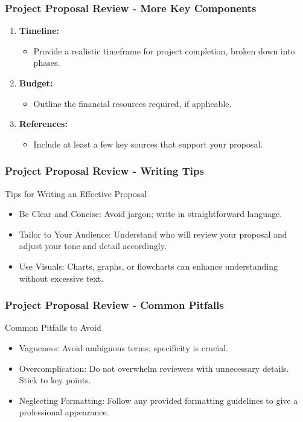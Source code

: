\documentclass[aspectratio=169]{beamer}
\begin{document}
\begin{frame}[fragile]
    \frametitle{Project Proposal Review - More Key Components}
    \begin{enumerate}[resume]
        \item \textbf{Timeline:}
            \begin{itemize}
                \item Provide a realistic timeframe for project completion, broken down into phases.
            \end{itemize}
        \item \textbf{Budget:}
            \begin{itemize}
                \item Outline the financial resources required, if applicable.
            \end{itemize}
        \item \textbf{References:}
            \begin{itemize}
                \item Include at least a few key sources that support your proposal.
            \end{itemize}
    \end{enumerate}
\end{frame}

\begin{frame}[fragile]
    \frametitle{Project Proposal Review - Writing Tips}
    \begin{block}{Tips for Writing an Effective Proposal}
        \begin{itemize}
            \item Be Clear and Concise: Avoid jargon; write in straightforward language.
            \item Tailor to Your Audience: Understand who will review your proposal and adjust your tone and detail accordingly.
            \item Use Visuals: Charts, graphs, or flowcharts can enhance understanding without excessive text.
        \end{itemize}
    \end{block}
\end{frame}

\begin{frame}[fragile]
    \frametitle{Project Proposal Review - Common Pitfalls}
    \begin{block}{Common Pitfalls to Avoid}
        \begin{itemize}
            \item Vagueness: Avoid ambiguous terms; specificity is crucial.
            \item Overcomplication: Do not overwhelm reviewers with unnecessary details. Stick to key points.
            \item Neglecting Formatting: Follow any provided formatting guidelines to give a professional appearance.
        \end{itemize}
    \end{block}
\end{frame}
\end{document}
